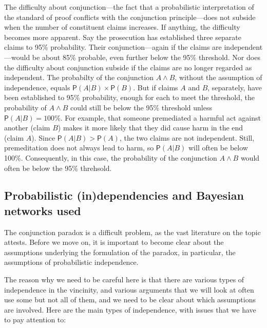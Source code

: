 \documentclass[
  10pt,
  dvipsnames,enabledeprecatedfontcommands]{scrartcl}
\newcommand{\et}{\wedge}
\newcommand{\pr}[1]{\mathsf{P}(#1)}
\begin{document}
The difficulty about conjunction---the fact that a probabilistic
interpretation of the standard of proof conflicts with the conjunction
principle---does not subside when the number of constituent claims
increases. If anything, the difficulty becomes more apparent. Say the
prosecution has established three separate claims to 95\% probability.
Their conjunction---again if the claims are independent---would be about
85\% probable, even further below the 95\% threshold. Nor does the
difficulty about conjunction subside if the claims are no longer
regarded as independent. The probabilty of the conjunction \(A \et B\),
without the assumption of independence, equals
\(\pr{A \vert B} \times \pr{B}\). But if claims \(A\) and \(B\),
separately, have been established to 95\% probability, enough for each
to meet the threshold, the probability of \(A \et B\) could still be
below the 95\% threshold unless \(\pr{A \vert B}=100\%\). For example,
that someone premediated a harmful act against another (claim \(B\))
makes it more likely that they did cause harm in the end (claim \(A\)).
Since \(\pr{A \vert B} > \pr{A}\), the two claims are not independent.
Still, premeditation does not always lead to harm, so \(\pr{A \vert B}\)
will often be below 100\%. Consequently, in this case, the probability
of the conjunction \(A \et B\) would often be below the 95\%
threhsold.


\hypertarget{probabilistic-independencies-and-bayesian-networks-used}{%
\subsection{Probabilistic (in)dependencies and Bayesian networks
used}\label{probabilistic-independencies-and-bayesian-networks-used}}

The conjunction paradox is a difficult problem, as the vast literature
on the topic attests. Before we move on, it is important to become clear
about the assumptions underlying the formulation of the paradox, in
particular, the assumptions of probabilistic independence.

The reason why we need to be careful here is that there are various
types of independence in the vincinity, and various arguments that we
will look at often use some but not all of them, and we need to be clear
about which assumptions are involved. Here are the main types of
independence, with issues that we have to pay attention to:
\end{document}
